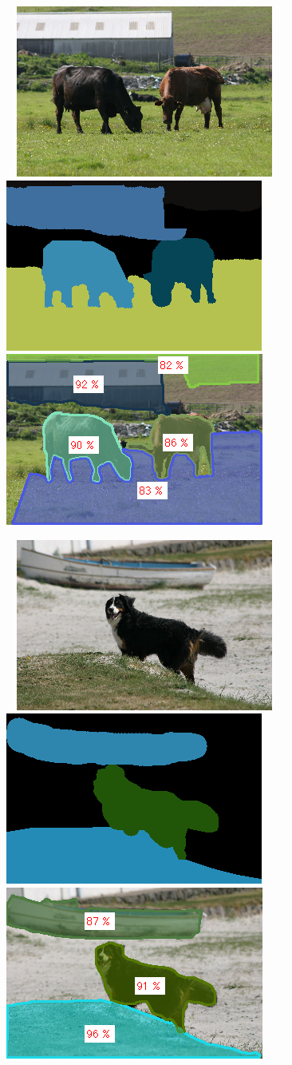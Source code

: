 \begin{figure}[!ht]
{\footnotesize\textit{\textcolor{white}{a)}}}\includegraphics[width=0.31\linewidth]{figs/1_18_s_00.png}
{\footnotesize\textit{\textcolor{white}{a)}}}\includegraphics[width=0.31\linewidth]{figs/1_18_s_gt.png}
{\footnotesize\textit{\textcolor{white}{a)}}}\includegraphics[width=0.31\linewidth]{figs/1_18_s_mvf.png}




{\footnotesize\textit{\textcolor{white}{a)}}}\includegraphics[width=0.31\linewidth]{figs/16_1_s_00.png}
{\footnotesize\textit{\textcolor{white}{a)}}}\includegraphics[width=0.31\linewidth]{figs/16_1_s_gt.png}
{\footnotesize\textit{\textcolor{white}{a)}}}\includegraphics[width=0.31\linewidth]{figs/16_1_s_mvf.png}



\end{figure}
